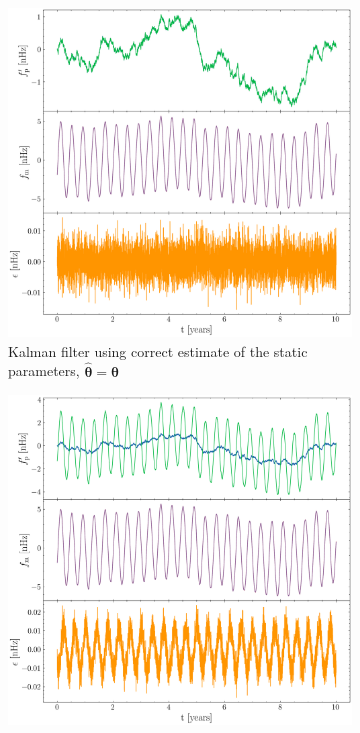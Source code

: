 \documentclass[fleqn,usenatbib,useAMS]{mnras}
\begin{document}
\begin{figure}
	\begin{subfigure}[b]{0.49\textwidth}
		\includegraphics[width=\textwidth]{images/Kalman_example_true_params_single}
		\caption{Kalman filter using correct estimate of the static parameters, $\hat{\boldsymbol{\theta}} = \boldsymbol{\theta}$ }
		\label{fig:6MB_BFS}
	\end{subfigure}  
    \hfill
	\begin{subfigure}[b]{0.49\textwidth}
		\includegraphics[width=\textwidth]{images/Kalman_example_wrong_params}

\end{subfigure}
\end{figure}
\end{document}
